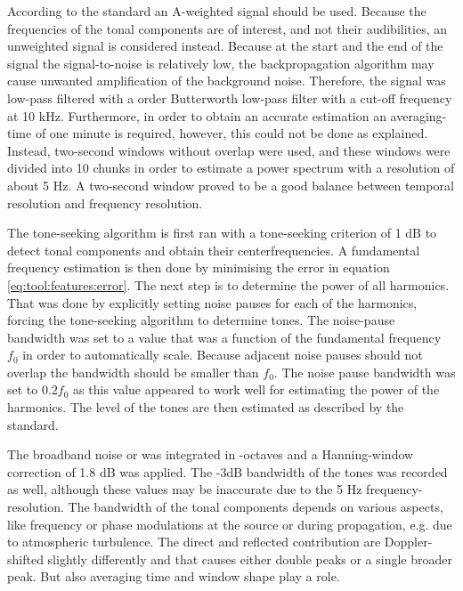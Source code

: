 According to the standard an A-weighted signal should be used. Because the
frequencies of the tonal components are of interest, and not their audibilities,
an unweighted signal is considered instead. Because at the start and the end of
the signal the signal-to-noise is relatively low, the backpropagation algorithm
may cause unwanted amplification of the background noise. Therefore, the signal
was low-pass filtered with a  order Butterworth low-pass filter with a
cut-off frequency at 10 kHz. Furthermore, in order to obtain an accurate
estimation an averaging-time of one minute is required, however, this could not
be done as explained. Instead, two-second windows without overlap were used, and
these windows were divided into 10 chunks in order to estimate a power spectrum
with a resolution of about 5 Hz. A two-second window proved to be a good balance
between temporal resolution and frequency resolution.

The tone-seeking algorithm is first ran with a tone-seeking criterion of 1 dB to
detect tonal components and obtain their centerfrequencies. A fundamental
frequency estimation is then done by minimising the error in equation
\eqref{eq:tool:features:error}. The next step is to determine the power of all
harmonics. That was done by explicitly setting noise pauses for each of the
harmonics, forcing the tone-seeking algorithm to determine tones.
The noise-pause bandwidth was set to a value that was a function of the fundamental
frequency $f_0$ in order to automatically scale. Because adjacent noise pauses
should not overlap the bandwidth should be smaller than $f_0$. The noise pause
bandwidth was set to $0.2 f_0$ as this value appeared to work well for
estimating the power of the  harmonics. The level of the tones are
then estimated as described by the standard.

The broadband noise or  was integrated in
-octaves and a Hanning-window correction of 1.8 dB was applied.
The -3dB bandwidth of the tones was recorded as well, although these values may
be inaccurate due to the 5 Hz frequency-resolution. The bandwidth of the tonal
components depends on various aspects, like frequency or phase modulations at
the source or during propagation, e.g. due to atmospheric turbulence. The direct
and reflected contribution are Doppler-shifted slightly differently and that
causes either double peaks or a single broader peak. But also averaging time and
window shape play a role.



